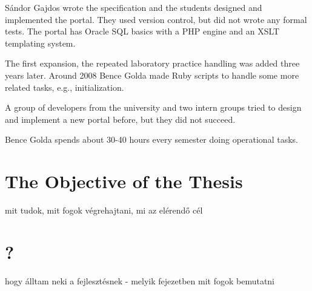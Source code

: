 Sándor Gajdos wrote the specification and the students designed and implemented the portal. They used version control, but did not wrote any formal tests. The portal has Oracle SQL basics with a PHP engine and an XSLT templating system.

The first expansion, the repeated laboratory practice handling was added three years later. Around 2008 Bence Golda made Ruby scripts to handle some more related tasks, e.g., initialization.

A group of developers from the university and two intern groups tried to design and implement a new portal before, but they did not succeed.

Bence Golda spends about 30-40 hours every semester doing operational tasks.

\section{The Objective of the Thesis}
mit tudok, mit fogok végrehajtani, mi az elérendő cél

\section{?}
hogy álltam neki a fejlesztésnek - melyik fejezetben mit fogok bemutatni


